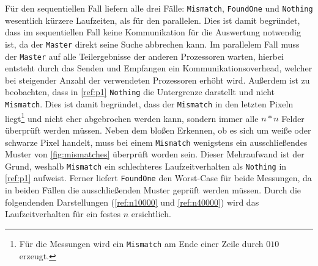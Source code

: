 Für den sequentiellen Fall liefern alle drei Fälle: \texttt{Mismatch}, \texttt{FoundOne} und \texttt{Nothing} wesentlich kürzere Laufzeiten, als für den parallelen. 
Dies ist damit begründet, dass im sequentiellen Fall keine Kommunikation für die Auswertung notwendig ist, da der \texttt{Master} direkt seine Suche abbrechen kann. 
Im parallelem Fall muss der \texttt{Master} auf alle Teilergebnisse der anderen Prozessoren warten, hierbei entsteht durch das Senden und Empfangen ein Kommunikationsoverhead, welcher bei steigender Anzahl der verwendeten Prozessoren erhöht wird.
Außerdem ist zu beobachten, dass in \autoref{ref:p1} \texttt{Nothing} die Untergrenze darstellt und nicht \texttt{Mismatch}. Dies ist damit begründet, dass der \texttt{Mismatch} in den letzten Pixeln liegt\footnote{Für die Messungen wird ein \texttt{Mismatch} am Ende einer Zeile durch $0 1 0$ erzeugt.} und nicht eher abgebrochen werden kann, sondern immer alle $n*n$ Felder überprüft werden müssen. 
Neben dem bloßen Erkennen, ob es sich um weiße oder schwarze Pixel handelt, muss bei einem \texttt{Mismatch} wenigstens ein ausschließendes Muster von \autoref{fig:mismatches} überprüft worden sein.
Dieser Mehraufwand ist der Grund, weshalb \texttt{Mismatch} ein schlechteres Laufzeitverhalten als \texttt{Nothing} in \autoref{ref:p1} aufweist.
Ferner liefert \texttt{FoundOne} den Worst-Case für beide Messungen, da in beiden Fällen die ausschließenden Muster geprüft werden müssen. 
Durch die folgendenden Darstellungen (\autoref{ref:n10000} und \autoref{ref:n40000}) wird das Laufzeitverhalten für ein festes $n$ ersichtlich.
